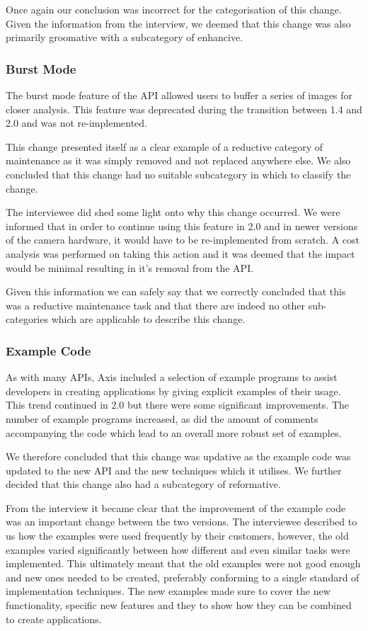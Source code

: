 \documentclass{sig-alternate}
\begin{document}
Once again our conclusion was incorrect for the categorisation of this change. Given the information from the interview, we deemed that this change was also primarily groomative with a subcategory of enhancive.


\subsubsection{Burst Mode}

The burst mode feature of the API allowed users to buffer a series of images for closer analysis. This feature was deprecated during the transition between 1.4 and 2.0 and was not re-implemented.

This change presented itself as a clear example of a reductive category of maintenance as it was simply removed and not replaced anywhere else. We also concluded that this change had no suitable subcategory in which to classify the change.

The interviewee did shed some light onto why this change occurred. We were informed that in order to continue using this feature in 2.0 and in newer versions of the camera hardware, it would have to be re-implemented from scratch. A cost analysis was performed on taking this action and it was deemed that the impact would be minimal resulting in it's removal from the API.

Given this information we can safely say that we correctly concluded that this was a reductive maintenance task and that there are indeed no other sub-categories which are applicable to describe this change.


\subsubsection{Example Code}

As with many APIs, Axis included a selection of example programs to assist developers in creating applications by giving explicit examples of their usage. This trend continued in 2.0 but there were some significant improvements. The number of example programs increased, as did the amount of comments accompanying the code which lead to an overall more robust set of examples.

We therefore concluded that this change was updative as the example code was updated to the new API and the new techniques which it utilises. We further decided that this change also had a subcategory of reformative.

From the interview it became clear that the improvement of the example code was an important change between the two versions. The interviewee described to us how the examples were used frequently by their customers, however, the old examples varied significantly between how different and even similar tasks were implemented. This ultimately meant that the old examples were not good enough and new ones needed to be created, preferably conforming to a single standard of implementation techniques. The new examples made sure to cover the new functionality, specific new features and they to show how they can be combined to create applications.
\end{document}
